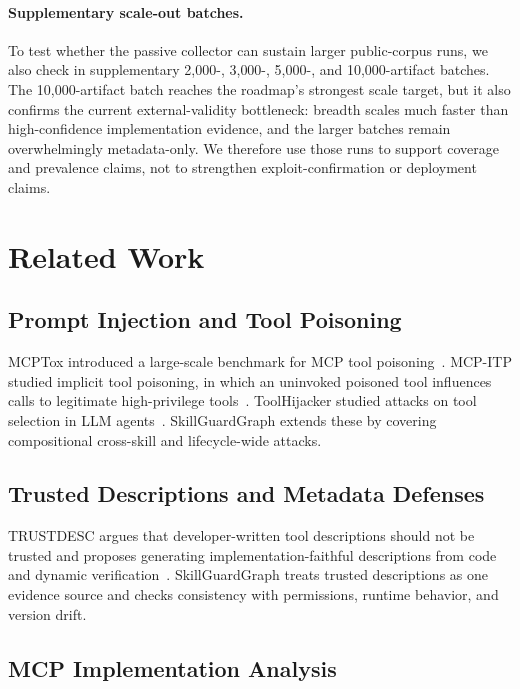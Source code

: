 \documentclass[10pt]{article}
\begin{document}
\paragraph{Supplementary scale-out batches.}
To test whether the passive collector can sustain larger public-corpus runs, we also check in supplementary 2{,}000-, 3{,}000-, 5{,}000-, and 10{,}000-artifact batches. The 10{,}000-artifact batch reaches the roadmap's strongest scale target, but it also confirms the current external-validity bottleneck: breadth scales much faster than high-confidence implementation evidence, and the larger batches remain overwhelmingly metadata-only. We therefore use those runs to support coverage and prevalence claims, not to strengthen exploit-confirmation or deployment claims.
\section{Related Work}
\label{sec:related}

\subsection{Prompt Injection and Tool Poisoning}

MCPTox introduced a large-scale benchmark for MCP tool poisoning~\cite{wang2026mcptox}. MCP-ITP studied implicit tool poisoning, in which an uninvoked poisoned tool influences calls to legitimate high-privilege tools~\cite{li2026mcpitp}. ToolHijacker studied attacks on tool selection in LLM agents~\cite{shi2025toolhijacker}. SkillGuardGraph extends these by covering compositional cross-skill and lifecycle-wide attacks.

\subsection{Trusted Descriptions and Metadata Defenses}

TRUSTDESC argues that developer-written tool descriptions should not be trusted and proposes generating implementation-faithful descriptions from code and dynamic verification~\cite{ye2026trustdesc}. SkillGuardGraph treats trusted descriptions as one evidence source and checks consistency with permissions, runtime behavior, and version drift.

\subsection{MCP Implementation Analysis}
\end{document}
